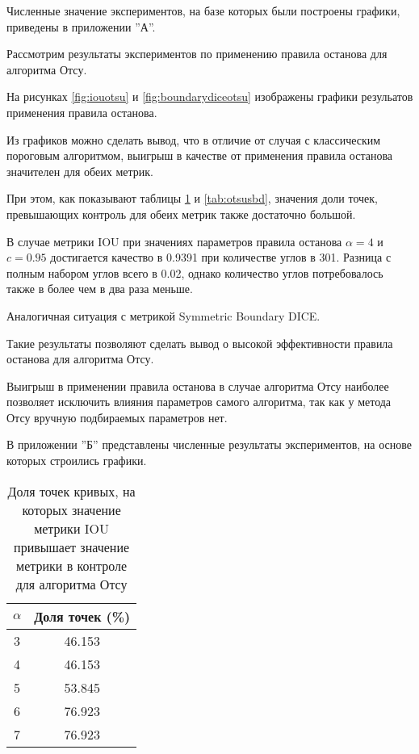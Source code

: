 Численные значение экспериментов, на базе которых были построены графики, приведены в приложении ''А''.

Рассмотрим результаты экспериментов по применению правила останова для алгоритма Отсу. 

На рисунках \ref*{fig:iouotsu} и \ref*{fig:boundarydiceotsu} изображены графики резульатов применения правила останова. 

Из графиков можно сделать вывод, что в отличие от случая с классическим пороговым алгоритмом, выигрыш в качестве от применения правила останова значителен для обеих метрик. 

При этом, как показывают таблицы \ref*{tab:otsuiou} и \ref*{tab:otsusbd}, значения доли точек, превышающих контроль для обеих метрик также достаточно большой.

В случае метрики IOU при значениях параметров правила останова \(\alpha = 4\) и \(c = 0.95\) достигается качество в 0.9391 при количестве углов в 301. Разница с полным набором углов всего в 0.02, однако количество углов потребовалось также в более чем в два раза меньше.

Аналогичная ситуация с метрикой Symmetric Boundary DICE.
 
Такие результаты позволяют сделать вывод о высокой эффективности правила останова для алгоритма Отсу.

Выигрыш в применении правила останова в случае алгоритма Отсу наиболее позволяет исключить влияния параметров самого алгоритма, так как у метода Отсу вручную подбираемых параметров нет.

В приложении ''Б'' представлены численные результаты экспериментов, на основе которых строились графики.

 


\begin{table}[H]
\centering
\caption{Доля точек кривых, на которых значение метрики IOU привышает значение метрики в  контроле для алгоритма Отсу}
\label{tab:otsuiou}
\begin{tabular}{|c|c|}
\hline
\(\alpha\) & Доля точек (\%) \\
\hline
3 & 46.153 \\
4 & 46.153 \\
5 & 53.845 \\
6 & 76.923 \\
7 & 76.923 \\
\hline
\end{tabular}
\end{table}

